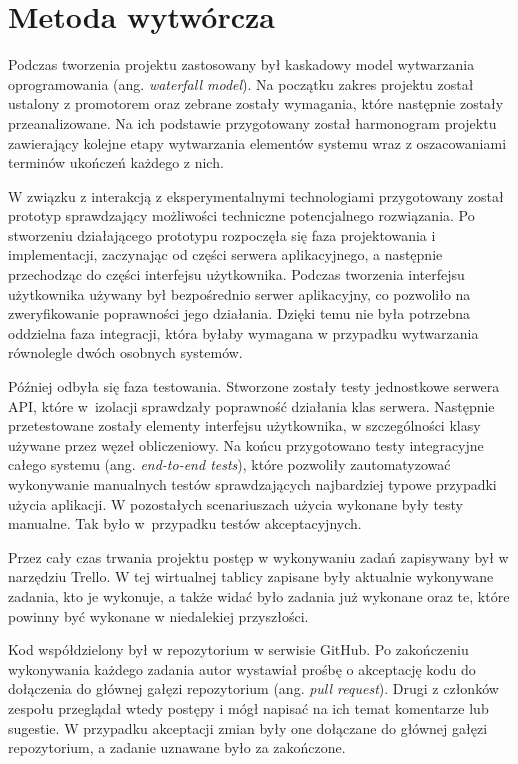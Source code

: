 \documentclass[a4paper,11pt,twoside]{report}
\theoremstyle{definition}
\begin{document}
\section{Metoda wytwórcza}
    \label{metoda-wytworcza}
    
    Podczas tworzenia projektu zastosowany był kaskadowy model wytwarzania oprogramowania (ang. \textit{waterfall model}).
    Na początku zakres projektu został ustalony z promotorem oraz zebrane zostały wymagania, które następnie zostały przeanalizowane.
    Na ich podstawie przygotowany został harmonogram projektu zawierający kolejne etapy wytwarzania elementów systemu
    wraz z oszacowaniami terminów ukończeń każdego z nich.
    
    W związku z interakcją z eksperymentalnymi technologiami przygotowany został prototyp
    sprawdzający możliwości techniczne potencjalnego rozwiązania.
    Po stworzeniu działającego prototypu rozpoczęła się faza projektowania i implementacji, zaczynając od części serwera aplikacyjnego,
    a następnie przechodząc do części interfejsu użytkownika.
    Podczas tworzenia interfejsu użytkownika używany był bezpośrednio serwer aplikacyjny, co pozwoliło na zweryfikowanie
    poprawności jego działania.
    Dzięki temu nie była potrzebna oddzielna faza integracji, która byłaby wymagana w przypadku wytwarzania
    równolegle dwóch osobnych systemów.
    
    Później odbyła się faza testowania.
    Stworzone zostały testy jednostkowe serwera API, które w~izolacji sprawdzały poprawność działania klas serwera.
    Następnie przetestowane zostały elementy interfejsu użytkownika, w szczególności klasy używane przez węzeł obliczeniowy.
    Na końcu przygotowano testy integracyjne całego systemu (ang. \textit{end-to-end tests}),
    które pozwoliły zautomatyzować wykonywanie manualnych testów sprawdzających najbardziej typowe przypadki
    użycia aplikacji.
    W pozostałych scenariuszach użycia wykonane były testy manualne.
    Tak było w~przypadku testów akceptacyjnych.
    
    Przez cały czas trwania projektu postęp w wykonywaniu zadań zapisywany był w narzędziu Trello.
    W tej wirtualnej tablicy zapisane były aktualnie wykonywane zadania, kto je wykonuje, a także
    widać było zadania już wykonane oraz te, które powinny być wykonane w niedalekiej przyszłości.
    
    Kod współdzielony był w repozytorium w serwisie GitHub.
    Po zakończeniu wykonywania każdego zadania autor wystawiał prośbę o akceptację kodu do dołączenia
    do głównej gałęzi repozytorium (ang. \textit{pull request}).
    Drugi z członków zespołu przeglądał wtedy postępy i mógł napisać na ich temat komentarze lub sugestie.
    W przypadku akceptacji zmian były one dołączane do głównej gałęzi repozytorium, a zadanie uznawane było
    za zakończone.
    
\end{document}
